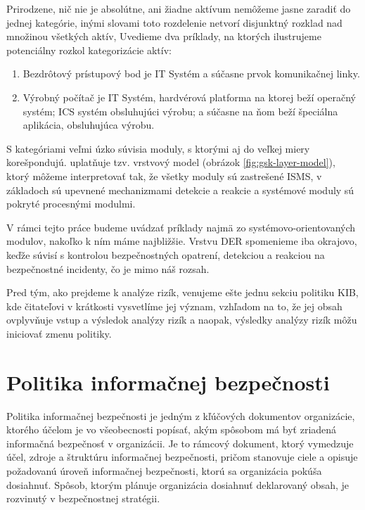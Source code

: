 \begin{table}[h!]
\begin{center}
\begin{tabular}{ |p{}|p{}|p{}| }
            \\
            \hline
        \end{tabular}
    \end{center}
    \end{table}

Prirodzene, nič nie je absolútne, ani žiadne aktívum nemôžeme jasne zaradiť do jednej kategórie, inými slovami toto rozdelenie netvorí disjunktný
rozklad nad množinou všetkých aktív, Uvedieme dva príklady, na ktorých ilustrujeme potenciálny rozkol kategorizácie aktív:
\begin{enumerate}[nosep]
    \item Bezdrôtový prístupový bod je IT Systém a súčasne prvok komunikačnej linky.
    \item Výrobný počítač je IT Systém, hardvérová platforma na ktorej beží operačný systém; ICS systém obsluhujúci výrobu; a súčasne na ňom beží
    špeciálna aplikácia, obsluhujúca výrobu.
\end{enumerate}

S kategóriami veľmi úzko súvisia moduly, s ktorými aj do veľkej miery korešpondujú. \cite{GSK} uplatňuje tzv. vrstvový model (obrázok
\ref{fig:gsk-layer-model}), ktorý môžeme interpretovať tak, že všetky moduly sú zastrešené ISMS, v základoch sú upevnené mechanizmami detekcie
a reakcie a systémové moduly sú pokryté procesnými modulmi.  



V rámci tejto práce budeme uvádzať príklady najmä zo systémovo-orientovaných modulov, nakoľko k ním máme najbližšie. Vrstvu DER spomenieme iba
okrajovo, keďže súvisí s kontrolou bezpečnostných opatrení, detekciou a reakciou na bezpečnostné incidenty, čo je mimo náš rozsah.

Pred tým, ako prejdeme k analýze rizík, venujeme ešte jednu sekciu politiku KIB, kde čitateľovi v krátkosti vysvetlíme jej význam, vzhľadom
na to, že jej obsah ovplyvňuje vstup a výsledok analýzy rizík a naopak, výsledky analýzy rizík môžu iniciovať zmenu politiky.

\section{Politika informačnej bezpečnosti}
Politika informačnej bezpečnosti je jedným z kľúčových dokumentov organizácie, ktorého účelom je vo všeobecnosti popísať, akým spôsobom má byť
zriadená informačná bezpečnosť v organizácii. Je to rámcový dokument, ktorý vymedzuje účel, zdroje a štruktúru informačnej bezpečnosti, pričom
stanovuje ciele a opisuje požadovanú úroveň informačnej bezpečnosti, ktorú sa organizácia pokúša dosiahnuť. Spôsob, ktorým plánuje organizácia
dosiahnuť deklarovaný obsah, je rozvinutý v bezpečnostnej stratégii.

